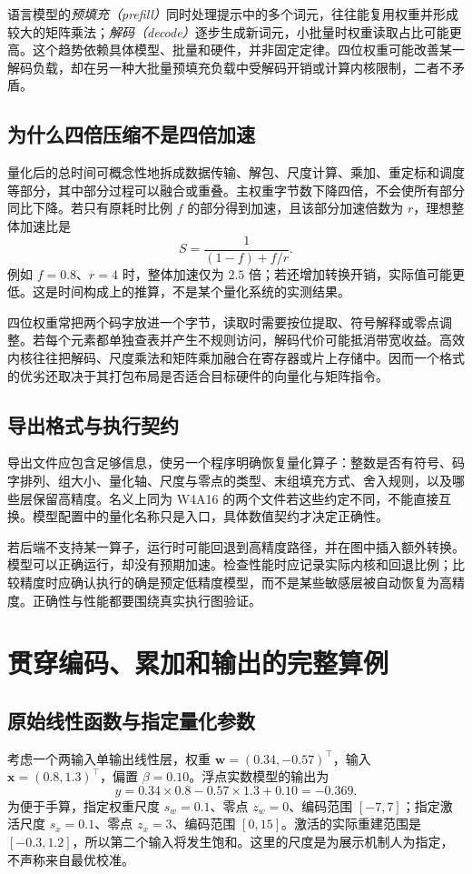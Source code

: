 \documentclass[UTF8,12pt,a4paper,fontset=fandol]{ctexart}
\begin{document}
语言模型的\emph{预填充（prefill）}同时处理提示中的多个词元，往往能复用权重并形成较大的矩阵乘法；\emph{解码（decode）}逐步生成新词元，小批量时权重读取占比可能更高。这个趋势依赖具体模型、批量和硬件，并非固定定律。四位权重可能改善某一解码负载，却在另一种大批量预填充负载中受解码开销或计算内核限制，二者不矛盾。

\subsection{为什么四倍压缩不是四倍加速}
量化后的总时间可概念性地拆成数据传输、解包、尺度计算、乘加、重定标和调度等部分，其中部分过程可以融合或重叠。主权重字节数下降四倍，不会使所有部分同比下降。若只有原耗时比例 $f$ 的部分得到加速，且该部分加速倍数为 $r$，理想整体加速比是
\begin{equation}
 S=\frac1{(1-f)+f/r}.
 \label{eq:quant-amdahl}
\end{equation}
例如 $f=0.8$、$r=4$ 时，整体加速仅为 $2.5$ 倍；若还增加转换开销，实际值可能更低。这是时间构成上的推算，不是某个量化系统的实测结果。

四位权重常把两个码字放进一个字节，读取时需要按位提取、符号解释或零点调整。若每个元素都单独查表并产生不规则访问，解码代价可能抵消带宽收益。高效内核往往把解码、尺度乘法和矩阵乘加融合在寄存器或片上存储中。因而一个格式的优劣还取决于其打包布局是否适合目标硬件的向量化与矩阵指令。

\subsection{导出格式与执行契约}
导出文件应包含足够信息，使另一个程序明确恢复量化算子：整数是否有符号、码字排列、组大小、量化轴、尺度与零点的类型、末组填充方式、舍入规则，以及哪些层保留高精度。名义上同为 W4A16 的两个文件若这些约定不同，不能直接互换。模型配置中的量化名称只是入口，具体数值契约才决定正确性。

若后端不支持某一算子，运行时可能回退到高精度路径，并在图中插入额外转换。模型可以正确运行，却没有预期加速。检查性能时应记录实际内核和回退比例；比较精度时应确认执行的确是预定低精度模型，而不是某些敏感层被自动恢复为高精度。正确性与性能都要围绕真实执行图验证。

\section{贯穿编码、累加和输出的完整算例}
\label{sec:quant-example}

\subsection{原始线性函数与指定量化参数}
考虑一个两输入单输出线性层，权重 $\mathbf w=(0.34,-0.57)^\top$，输入 $\mathbf x=(0.8,1.3)^\top$，偏置 $\beta=0.10$。浮点实数模型的输出为
\[
 y=0.34\times0.8-0.57\times1.3+0.10=-0.369.
\]
为便于手算，指定权重尺度 $s_w=0.1$、零点 $z_w=0$、编码范围 $[-7,7]$；指定激活尺度 $s_x=0.1$、零点 $z_x=3$、编码范围 $[0,15]$。激活的实际重建范围是 $[-0.3,1.2]$，所以第二个输入将发生饱和。这里的尺度是为展示机制人为指定，不声称来自最优校准。
\end{document}

